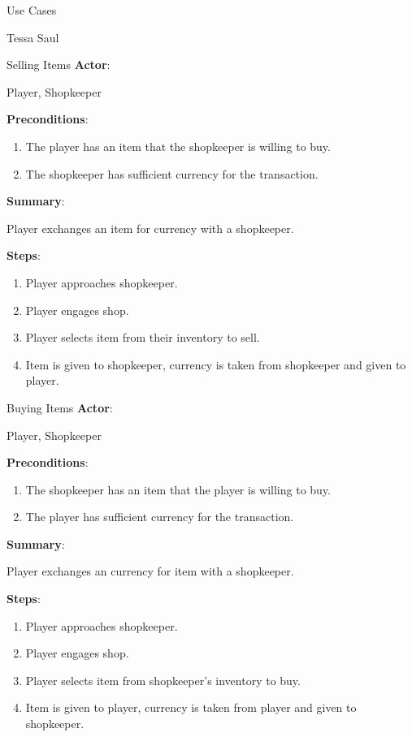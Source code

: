 \documentclass[12pt]{report}
\begin{document}
\begin{section}{Use Cases}
\begin{subsection}{Tessa Saul}
\begin{subsubsection}{Selling Items}
\textbf{Actor}:

Player, Shopkeeper

\textbf{Preconditions}:

\begin{enumerate}
\item The player has an item that the shopkeeper is willing to buy.
\item The shopkeeper has sufficient currency for the transaction.
\end{enumerate}

\textbf{Summary}:

Player exchanges an item for currency with a shopkeeper.

\textbf{Steps}:
 
\begin{enumerate}
\item Player approaches shopkeeper.
\item Player engages shop.
\item Player selects item from their inventory to sell.
\item Item is given to shopkeeper, currency is taken from shopkeeper and
given to player.
\end{enumerate}
\end{subsubsection}

\begin{subsubsection}{Buying Items}
\textbf{Actor}:

Player, Shopkeeper

\textbf{Preconditions}:

\begin{enumerate}
\item The shopkeeper has an item that the player is willing to buy.
\item The player has sufficient currency for the transaction.
\end{enumerate}

\textbf{Summary}:

Player exchanges an currency for item with a shopkeeper.

\textbf{Steps}:
 
\begin{enumerate}
\item Player approaches shopkeeper.
\item Player engages shop.
\item Player selects item from shopkeeper's inventory to buy.
\item Item is given to player, currency is taken from player and given to
shopkeeper.
\end{enumerate}
\end{subsubsection}


\end{subsection}
\end{section}
\end{document}

